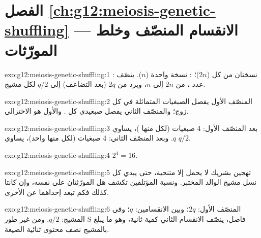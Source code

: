 \section*{الفصل \ref{ch:g12:meiosis-genetic-shuffling} --- الانقسام المنصّف وخلط المورّثات}

\begin{solution}{exo:g12:meiosis-genetic-shuffling:1}
: نسختان من كل  ($2n$)؛ :
نسخة واحدة ($n$).  ينصّف عدد ، من $2n$ إلى
$n$، ويرد  من $2q$ (بعد التضاعف) إلى $q/2$ لكل مشيج.
\end{solution}

\begin{solution}{exo:g12:meiosis-genetic-shuffling:2}
المنصّف الأول يفصل الصبغيات المتماثلة في كل زوج؛ والمنصّف الثاني يفصل
صبغيدي كل . والأول هو الاختزالي.
\end{solution}

\begin{solution}{exo:g12:meiosis-genetic-shuffling:3}
بعد المنصّف الأول: 4 صبغيات (لكل منها )،  يساوي $q$. وبعد
المنصّف الثاني: 4 صبغيات (لكل منها  واحد)،  يساوي $q/2$.
\end{solution}

\begin{solution}{exo:g12:meiosis-genetic-shuffling:4}
$2^4 = 16$.
\end{solution}

\begin{solution}{exo:g12:meiosis-genetic-shuffling:5}
تهجين بشريك لا يحمل إلا  متنحية، حتى يبدي كل نسل مشيج الوالد
المختبر. ونسبة المؤتلفين تكشف هل المورّثتان على  نفسه، وإن كانتا
كذلك فكم تبعد إحداهما عن الأخرى.
\end{solution}

\begin{solution}{exo:g12:meiosis-genetic-shuffling:6}
المنصّف الأول: $2q$؛ وبين الانقسامين: $q$؛ وفي المشيج: $q/2$. ومن غير
طور S فاصل، ينصّف الانقسام الثاني كمية  ثانية، وهو ما يبلغ بالمشيج
نصف محتوى  ثنائية الصيغة.
\end{solution}

